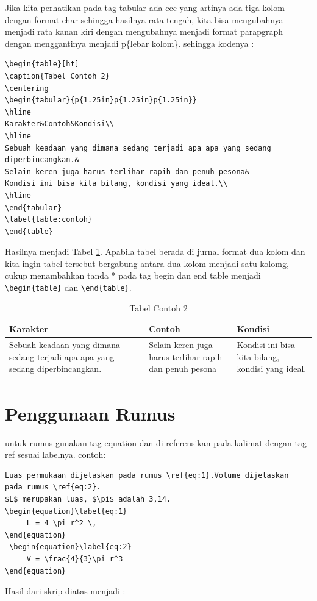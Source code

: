 Jika kita perhatikan pada tag tabular ada ccc yang artinya ada tiga kolom dengan format char sehingga hasilnya rata tengah, kita bisa mengubahnya menjadi rata kanan kiri dengan mengubahnya menjadi format parapgraph dengan menggantinya menjadi p\{lebar kolom\}. sehingga kodenya :
\begin{verbatim}
\begin{table}[ht]
\caption{Tabel Contoh 2}
\centering
\begin{tabular}{p{1.25in}p{1.25in}p{1.25in}}
\hline
Karakter&Contoh&Kondisi\\
\hline
Sebuah keadaan yang dimana sedang terjadi apa apa yang sedang diperbincangkan.&
Selain keren juga harus terlihar rapih dan penuh pesona&
Kondisi ini bisa kita bilang, kondisi yang ideal.\\
\hline
\end{tabular}
\label{table:contoh}
\end{table}
\end{verbatim}
Hasilnya menjadi Tabel \ref{table:contohtabel2}. Apabila tabel berada di jurnal format dua kolom dan kita ingin tabel tersebut bergabung antara dua kolom menjadi satu kolomg, cukup menambahkan tanda * pada tag begin dan end table menjadi \verb|\begin{table}| dan \verb|\end{table}|.

\begin{table}[ht]
\caption{Tabel Contoh 2}
\centering
\begin{tabular}{p{1.25in}p{1.25in}p{1.25in}}
\hline
Karakter&Contoh&Kondisi\\
\hline
Sebuah keadaan yang dimana sedang terjadi apa apa yang sedang diperbincangkan.&
Selain keren juga harus terlihar rapih dan penuh pesona&
Kondisi ini bisa kita bilang, kondisi yang ideal.\\
\hline
\end{tabular}
\label{table:contohtabel2}
\end{table}


\section{Penggunaan Rumus}

untuk rumus gunakan tag equation dan di referensikan pada kalimat dengan tag ref sesuai labelnya. contoh:
\begin{verbatim}
Luas permukaan dijelaskan pada rumus \ref{eq:1}.Volume dijelaskan 
pada rumus \ref{eq:2}.
$L$ merupakan luas, $\pi$ adalah 3,14.
\begin{equation}\label{eq:1}
     L = 4 \pi r^2 \,
\end{equation}
 \begin{equation}\label{eq:2}
     V = \frac{4}{3}\pi r^3
\end{equation}
\end{verbatim}
Hasil dari skrip diatas menjadi :

